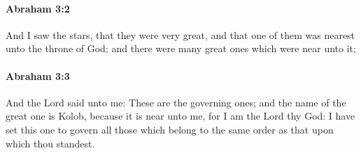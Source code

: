 		\paragraph{Abraham 3:2} %
			\label{ABRAHAM-3-2}

			And I saw the stars, that they were very great, and that one of them was nearest unto the throne of God; and there were many great ones which were near unto it;


		\paragraph{Abraham 3:3} %
			\label{ABRAHAM-3-3}

			And the Lord said unto me: These are the governing ones; and the name of the great one is Kolob, because it is near unto me, for I am the Lord thy God: I have set this one to govern all those which belong to the same order as that upon which thou standest.


